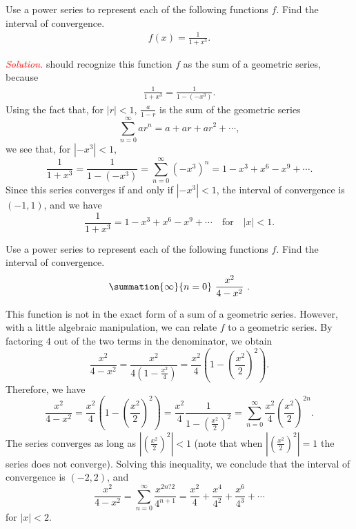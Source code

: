 \documentclass{report}
\begin{document}
    \bigbreak \noindent 
    \begin{exm}
       Use a power series to represent each of the following functions  $f$. Find the interval of convergence. 
       \begin{align*}
           f(x) = \frac{1}{1+x^{3}}
       .\end{align*}
    \end{exm}
    \bigbreak \noindent 
    \textcolor{red}{\textit{Solution.}} should recognize this function $f$ as the sum of a geometric series, because
    \begin{align*}
        \frac{1}{1+x^{3}} = \frac{1}{1-(-x^{3})}
    .\end{align*}
    Using the fact that, for \( |r| < 1 \), \(\frac{a}{1 - r}\) is the sum of the geometric series
\[
    \sum_{n=0}^{\infty} ar^n = a + ar + ar^2 + \cdots,
\]
we see that, for \( \left| -x^3 \right| < 1 \),
\[
    \frac{1}{1 + x^3} = \frac{1}{1 - (-x^3)} = \sum_{n=0}^{\infty} (-x^3)^n = 1 - x^3 + x^6 - x^9 + \cdots.
\]
Since this series converges if and only if \( \left| -x^3 \right| < 1 \), the interval of convergence is \( (-1, 1) \), and we have
\[
    \frac{1}{1 + x^3} = 1 - x^3 + x^6 - x^9 + \cdots \quad \text{for} \quad |x| < 1.
\]


    \pagebreak \bigbreak \noindent 
    \begin{exm}
       Use a power series to represent each of the following functions  $f$. Find the interval of convergence. 
       \begin{align*}
           \summation{\infty}{n=0}\ \frac{x^{2}}{4-x^{2}}\ 
       .\end{align*}
    \end{exm}
    \bigbreak \noindent 
    This function is not in the exact form of a sum of a geometric series. However, with a little algebraic manipulation, we can relate \( f \) to a geometric series. By factoring \( 4 \) out of the two terms in the denominator, we obtain
    \[
        \frac{x^2}{4 - x^2} = \frac{x^2}{4(1 - \frac{x^2}{4})} = \frac{x^2}{4}\left(1 - \left(\frac{x^2}{2}\right)^2\right).
    \]
    \bigbreak \noindent 
    Therefore, we have
    \[
        \frac{x^2}{4 - x^2} = \frac{x^2}{4}\left(1 - \left(\frac{x^2}{2}\right)^2\right) = \frac{x^2}{4}\frac{1}{1 - \left(\frac{x^2}{2}\right)^2} = \sum_{n=0}^{\infty} \frac{x^2}{4}\left(\frac{x^2}{2}\right)^{2n}.
    \]
    \bigbreak \noindent 
    The series converges as long as \( \left|\left(\frac{x^2}{2}\right)^2\right| < 1 \) (note that when \( \left|\left(\frac{x^2}{2}\right)^2\right| = 1 \) the series does not converge). Solving this inequality, we conclude that the interval of convergence is \( (-2, 2) \), and
    \[
        \frac{x^2}{4 - x^2} = \sum_{n=0}^{\infty} \frac{x^{2n?2}}{4^{n+1}} = \frac{x^2}{4} + \frac{x^4}{4^2} + \frac{x^6}{4^3} + \cdots
    \]
    \bigbreak \noindent 
    for \( |x| < 2 \).
\end{document}
